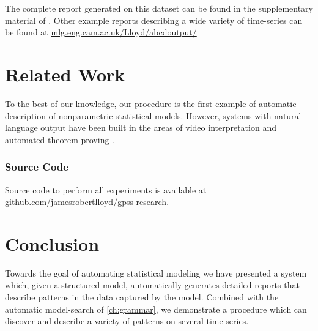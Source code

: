 The complete report generated on this dataset can be found in the supplementary material of \citep{LloDuvGroetal14}.
Other example reports describing a wide variety of time-series can be found at \url{mlg.eng.cam.ac.uk/Lloyd/abcdoutput/}



\section{Related Work}
\label{sec:description-related-work}


To the best of our knowledge, our procedure is the first example of automatic description of nonparametric statistical models.
However, systems with natural language output have been built in the areas of video interpretation \citep{barbu2012video} and automated theorem proving \citep{GanesalingamG13}.

\subsubsection{Source Code}
Source code to perform all experiments is available at \url{github.com/jamesrobertlloyd/gpss-research}. 


\section{Conclusion}
Towards the goal of automating statistical modeling we have presented a system which, given a structured \gp{} model, automatically generates detailed reports that describe patterns in the data captured by the model.
Combined with the automatic model-search of \cref{ch:grammar}, we demonstrate a procedure which can discover and describe a variety of patterns on several time series.









\outbpdocument{


}


